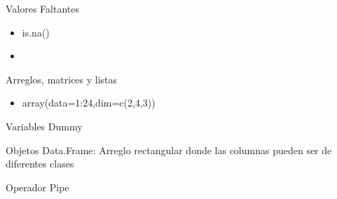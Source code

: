 Valores Faltantes
\begin{itemize}
	\item is.na()
	\item 
\end{itemize}

Arreglos, matrices y listas
\begin{itemize}
	\item array(data=1:24,dim=c(2,4,3))
\end{itemize}

Variables Dummy

Objetos Data.Frame: Arreglo rectangular donde las columnas pueden ser de diferentes clases

Operador Pipe